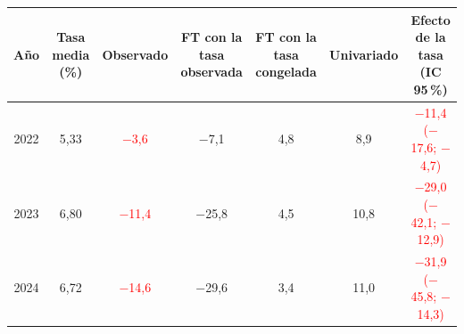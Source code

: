 \begin{tabular}{ccccccc}
\toprule
A\~no & Tasa media (\%) & Observado & FT con la tasa observada & FT con la tasa congelada & Univariado & Efecto de la tasa (IC 95\,\%)
\\ \midrule
2022 & 5{,}33 & \textcolor{red}{\ensuremath{-}3{,}6} & \ensuremath{-}7{,}1 & 4{,}8 & 8{,}9 & \textcolor{red}{\ensuremath{-}11{,}4 (\ensuremath{-}17{,}6; \ensuremath{-}4{,}7)} \\
2023 & 6{,}80 & \textcolor{red}{\ensuremath{-}11{,}4} & \ensuremath{-}25{,}8 & 4{,}5 & 10{,}8 & \textcolor{red}{\ensuremath{-}29{,}0 (\ensuremath{-}42{,}1; \ensuremath{-}12{,}9)} \\
2024 & 6{,}72 & \textcolor{red}{\ensuremath{-}14{,}6} & \ensuremath{-}29{,}6 & 3{,}4 & 11{,}0 & \textcolor{red}{\ensuremath{-}31{,}9 (\ensuremath{-}45{,}8; \ensuremath{-}14{,}3)} \\
\bottomrule
\end{tabular}

